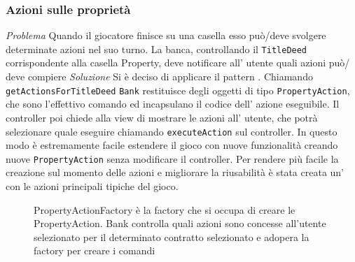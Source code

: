 \subsubsection{Azioni sulle proprietà}
\emph{Problema}\newline
Quando il giocatore finisce su una casella 
esso può/deve svolgere determinate azioni nel suo turno. 
La banca, controllando il \texttt{TitleDeed} corrispondente alla casella Property,  
deve notificare all' utente quali azioni può/ deve compiere\newline
\emph{Soluzione}\newline
Si è deciso di applicare il pattern . 
Chiamando \texttt{getActionsForTitleDeed} \texttt{Bank} 
restituisce degli oggetti di tipo \texttt{PropertyAction}, 
che sono l'effettivo comando ed incapsulano il codice dell' azione eseguibile.
Il controller poi chiede alla view di mostrare le azioni all' utente, 
che potrà selezionare quale eseguire chiamando \texttt{executeAction} sul controller.\newline 
In questo modo è estremamente facile estendere il gioco 
con nuove funzionalità creando nuove \texttt{PropertyAction} senza 
modificare il controller.\newline
Per rendere più facile la creazione sul momento delle azioni e 
migliorare la riusabilità è stata creata un’  
con le azioni principali tipiche del gioco.
\begin{figure}[H]
    \centering
    \caption{PropertyActionFactory è la factory che si occupa di creare le PropertyAction. Bank controlla quali azioni sono concesse all'utente selezionato
    per il determinato contratto selezionato e adopera la factory per creare i comandi}
	\label{img:PropertyAction}
\end{figure}